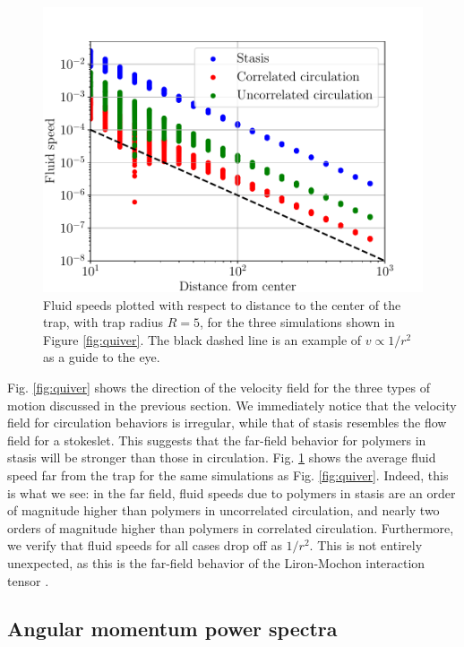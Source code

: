 \documentclass[11pt]{ucthesis}
\begin{document}
\begin{figure}
\centering
\includegraphics[width=\columnwidth]{farfield}
\caption{Fluid speeds plotted with respect to distance to the center of the trap, with trap radius $R=5$, for the three simulations shown in Figure \ref{fig:quiver}. The black dashed line is an example of $v\propto 1/r^2$ as a guide to the eye.\label{fig:farfield}}
\end{figure}

Fig. \ref{fig:quiver} shows the direction of the velocity field for the three types of motion discussed in the previous section. We immediately notice that the velocity field for circulation behaviors is irregular, while that of stasis resembles the flow field for a stokeslet. This suggests that the far-field behavior for polymers in stasis will be stronger than those in circulation. Fig. \ref{fig:farfield} shows the average fluid speed far from the trap for the same simulations as Fig. \ref{fig:quiver}. Indeed, this is what we see: in the far field, fluid speeds due to polymers in stasis are an order of magnitude higher than polymers in uncorrelated circulation, and nearly two orders of magnitude higher than polymers in correlated circulation. Furthermore, we verify that fluid speeds for all cases drop off as $1/r^2$. This is not entirely unexpected, as this is the far-field behavior of the Liron-Mochon interaction tensor \cite{Liron1976,martin2018emergence}.

\subsection{Angular momentum power spectra}
\end{document}
